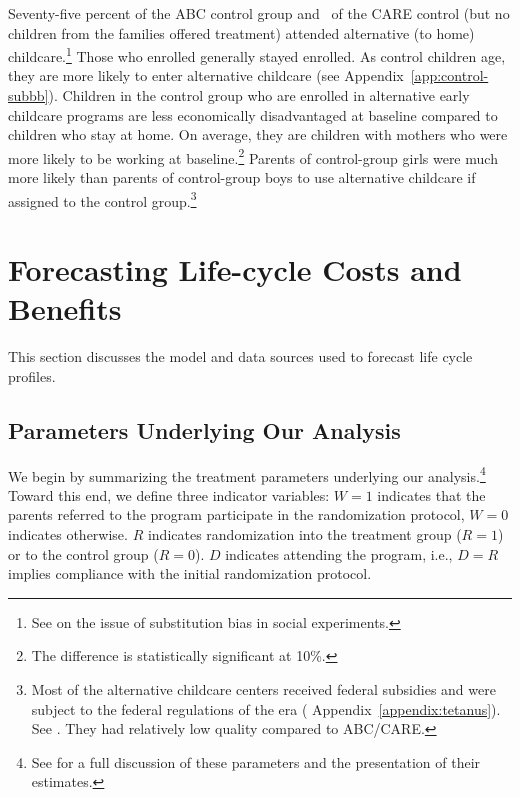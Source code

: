 Seventy-five percent of the ABC control group and \treatsubscarec\ of the CARE control (but no children from the families offered treatment) attended alternative (to home) childcare.\footnote{See \cite{Heckman_Hohmann_etal_2000_QJE} on the issue of substitution bias in social experiments.} Those who enrolled generally stayed enrolled. As control children age, they are more likely to enter alternative childcare (see  Appendix~\ref{app:control-subbb}). Children in the control group who are enrolled in alternative early childcare programs are less economically disadvantaged at baseline compared to children who stay at home. On average, they are children with mothers who were more likely to be working at baseline.\footnote{The difference is statistically significant at 10\%.} Parents of control-group girls were much more likely than parents of control-group boys to use alternative childcare if assigned to the control group.\footnote{Most of the alternative childcare centers received federal subsidies and were subject to the federal regulations of the era ( Appendix~\ref{appendix:tetanus}). See \citet{Department-of-Health_1968_DayCareRequirements,NCGA_1971_House-Bill-100,Ramey-et-al_1977_Intro-to-ABC,Ramey_Campbell_1979_SR,Ramey_McGinness_etal_1982_Abecedarianapproach, Burchinal_Campbell_etal_1997_CD}. They had relatively low quality compared to ABC/CARE.}

\section{Forecasting Life-cycle Costs and Benefits}\label{section:cbamethodology}

This section discusses the model and data sources used to forecast life cycle profiles.

\subsection{Parameters Underlying Our Analysis}
\label{section:methodsquestions}

We begin by summarizing the treatment parameters underlying our analysis.\footnote{See \citet{Garcia_Heckman_Ziff_2017_Gender-Diff_UNPUBLISHED} for a full discussion of these parameters and the presentation of their estimates.} Toward this end, we define three indicator variables: $W = 1$ indicates that the parents referred to the program participate in the randomization protocol, $W = 0$ indicates otherwise. $R$ indicates randomization into the treatment group ($R = 1$) or to the control group ($R = 0$). $D$ indicates attending the program, i.e., $D = R$ implies compliance with the initial randomization protocol.

